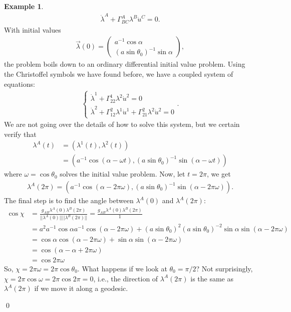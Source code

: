 \documentclass{book}
\theoremstyle{definition}
\newtheorem{exmp}{Example}[section]
\begin{document}
\begin{exmp}
	\begin{align*}
	\dot{\lambda}^A + \Gamma^A_{BC}\lambda^B\dot{u}^C = 0.
	\end{align*}
	With initial values
	\begin{align*}
	\vec{\lambda}(0) = 
	\begin{pmatrix}
	a^{-1}\cos\alpha\\
	\left(a\sin\theta_0 \right)^{-1}\sin\alpha 
	\end{pmatrix},
	\end{align*}
	the problem boils down to an ordinary differential initial value problem. Using the Christoffel symbols we have found before, we have a coupled system of equations:
	\begin{align*}
	\begin{cases*}
	\dot{\lambda}^1 + \Gamma^1_{22}\lambda^2 \dot{u}^2 = 0\\
	\dot{\lambda}^2 + \Gamma^2_{12}\lambda^1\dot{u}^1 + \Gamma^2_{21}\lambda^2\dot{u}^2= 0
	\end{cases*}.
	\end{align*}
	We are not going over the details of how to solve this system, but we certain verify that 
	\begin{align*}
	\lambda^A(t) &= \left( \lambda^1(t),\lambda^2(t)\right)\\
	&= \left(a^{-1}\cos(\alpha-\omega t), \left( a\sin\theta_0\right)^{-1}\sin(\alpha-\omega t)  \right)  
	\end{align*}
	where $\omega = \cos\theta_0$ solves the initial value problem. Now, let $t = 2\pi$, we get
	\begin{align*}
	\lambda^A(2\pi) = \left(a^{-1}\cos(\alpha - 2\pi\omega) , \left(a\sin\theta_0 \right)^{-1}\sin(\alpha-2\pi\omega)  \right). 
	\end{align*}
	The final step is to find the angle between $\lambda^A(0)$ and $\lambda^A(2\pi)$:
	\begin{align*}
	\cos\chi &= \frac{g_{AB}\lambda^A(0)\lambda^B(2\pi)}{\vert\vert \lambda^A(0)\vert\vert\vert\vert \lambda^B(2\pi)\vert\vert} = \frac{g_{AB}\lambda^A(0)\lambda^B(2\pi)}{1}\\
	&= a^2a^{-1}\cos\alpha a^{-1}\cos(\alpha-2\pi\omega) + (a\sin\theta_0)^2(a\sin\theta_0)^{-2}\sin\alpha\sin(\alpha-2\pi\omega)\\
	&= \cos\alpha\cos(\alpha-2\pi\omega) + \sin\alpha \sin(\alpha-2\pi\omega)\\
	&= \cos(\alpha-\alpha + 2\pi\omega)\\
	&= \cos 2\pi\omega
	\end{align*}
	So, ${\chi = 2\pi\omega = 2\pi\cos\theta_0}$. What happens if we look at $\theta_0 = \pi/2$? Not surprisingly, $\chi = 2\pi\cos\omega = 2\pi\cos 2\pi = 0$, i.e., the direction of $\lambda^A(2\pi)$ is the same as $\lambda^{A}(2\pi)$ if we move it along a geodesic. 
\end{exmp}\qed
\end{document}
